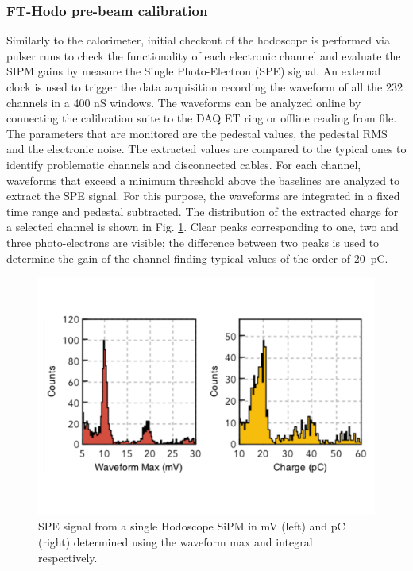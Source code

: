 \subsubsection{FT-Hodo pre-beam calibration}
Similarly to the calorimeter, initial checkout of the hodoscope is performed via pulser runs to check the functionality of each electronic channel and evaluate the SIPM gains by measure the Single Photo-Electron (SPE) signal. An external clock is used to trigger the data acquisition recording the waveform of all the 232 channels in a 400 nS windows. The waveforms can be analyzed online by connecting the calibration suite to the DAQ ET ring or offline reading from file. The parameters that are monitored are the pedestal values, the pedestal RMS and the electronic noise. The extracted values are compared to the typical ones to identify problematic channels and disconnected cables. For each channel, waveforms that exceed a minimum threshold above the baselines are analyzed to extract the SPE signal. For this purpose, the waveforms are integrated in a fixed time range and pedestal subtracted. The distribution of the extracted charge for a selected channel is shown in Fig. \ref{fig:fthodo_spe}. Clear peaks corresponding to one, two and three photo-electrons are visible; the difference between two peaks is used to determine the gain of the channel finding typical values of the order of 20~pC.
\begin{figure}
\includegraphics[width=1.0\columnwidth]{fig/fthodo_spe.pdf}
\caption{SPE signal from a single Hodoscope SiPM in mV (left) and pC (right) determined using the waveform max and integral respectively.   }
\label{fig:fthodo_spe}
\end{figure}

